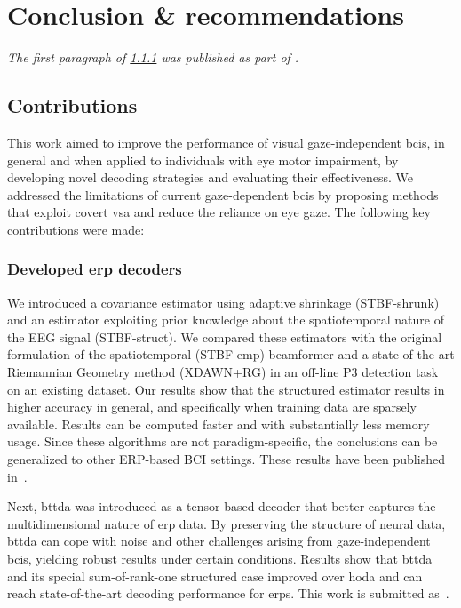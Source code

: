 \chapter{Conclusion \& recommendations}
\emph{The first paragraph of \cref{sec:conclusion/contrib/decoders} was published as
part of \textcite{VanDenKerchove2022}.}

\section{Contributions}

This work aimed to improve the performance of visual gaze-independent \acsp{bci}, in general
and when applied to individuals with eye motor impairment, by developing novel decoding
strategies and evaluating their effectiveness.
We addressed the limitations of current gaze-dependent \acp{bci} by proposing methods that
exploit covert \ac{vsa} and reduce the reliance on eye gaze.
The following key contributions were made:

\subsection{Developed \acs{erp} decoders}
\label{sec:conclusion/contrib/decoders}
We introduced a covariance estimator using adaptive shrinkage (STBF-shrunk) and an estimator
exploiting prior knowledge about the spatiotemporal nature of the EEG signal
(STBF-struct).
We compared these estimators with the original formulation of the
spatiotemporal (STBF-emp)
beamformer and a state-of-the-art Riemannian Geometry method (XDAWN+RG) in an off-line P3 detection task on
an existing dataset.
Our results show that the structured estimator results in higher accuracy in
general, and specifically when training data are sparsely available.
Results can be computed faster and with
substantially less memory usage.
Since these algorithms are not paradigm-specific, the conclusions can be
generalized to other ERP-based BCI settings.
These results have been published in~\textcite{VanDenKerchove2022}.

Next, \acf{bttda} was introduced as a tensor-based decoder that better captures the
multidimensional nature of \ac{erp} data.
By preserving the structure of neural data, \ac{bttda} can cope with noise and other challenges
arising from gaze-independent \acp{bci}, yielding robust results under certain conditions.
Results show that \ac{bttda} and its special sum-of-rank-one structured case
improved over \ac{hoda} and can reach state-of-the-art decoding performance for
\acp{erp}.
This work is submitted as~\textcite{VanDenKerchove2024a}.

